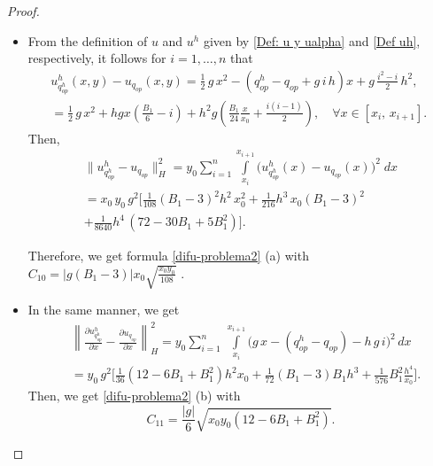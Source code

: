 \documentclass[axioms,article,submit,moreauthors]{Definitions/mdpi}
\newcommand\pder[2][]{\ensuremath{\tfrac{\partial#1}{\partial#2}}}
\begin{document}
\begin{proof}$ $
    \begin{itemize}
      
       \item[(a)] From the definition of $u$ and ${u^h}$ given by \eqref{Def: u y ualpha} and \eqref{Def uh}, respectively, it follows for $i= 1,\ldots, n$ that
  		      \begin{equation}
  		      \begin{array}{ll}
  		       {u^h_{q^h_{op}}}(x,y) - u_{q_{op}}(x,y) =  \tfrac{1}{2} \,g \,x^2-( {q^h_{op}} - q_{op} + g\,i\,h) x + g \,\tfrac{i^2-i}{2}\, h^2 , \quad \\[0.45cm]
  		        =\tfrac{1}{2} \,g \,x^2+h g x\left(\tfrac{B_1}{6}-i \right)+h^2g \left(\tfrac{B_1}{24}\tfrac{x}{x_0}+\tfrac{i(i-1)}{2} \right),\quad \forall x\in [x_i,\,x_{i+1}].
  		        \end{array}
  		        \end{equation}
  		      Then,  
\begin{equation*}
\begin{array}{ll} 
       \lVert {u^h_{q^h_{op}}} - u_{q_{op}}  \rVert _H^2= y_0 \displaystyle\sum\limits_{i=1}^n \displaystyle\int\limits_{x_i}^{x_{i+1}} \Big( {u^h_{q^h_{op}}}(x)-u_{q_{op}}(x)\Big)^2\; dx\\[0.45cm] 
      = x_0\, y_0\, g^2 \Big[\tfrac{1}{108} ( B_1-3)^2 h^2 \,x_0^2+\tfrac{1}{216} h^3\, x_0  (  B_1-3)^2 \\[0.45cm]
      +\frac{1}{8640} h^4\, (72 - 30 B_1 + 5 B_1^2)\Big].
           \end{array}
           \end{equation*}
           
Therefore, we get formula \eqref{difu-problema2} (a) with $C_{10}= \lvert  g (B_1-3)\rvert x_0 \sqrt{\tfrac{x_0 y_0}{108}}$ .
           
           \item [(b)] In the same manner, we get  
            \[\begin{array}{ll}
          &  \left\lVert \pder[{u^h_{q^h_{op}}}]{x} - \pder[u_{q_{op}}]{x}   \right\rVert _H^2 = y_0 \displaystyle \sum\limits_{i=1}^{n} \, \int\limits_{x_i} ^{x_{i+1}} \Big ( g\,x  -({q^h_{op}} - q_{op} ) - h\,g\,i\Big )^2\,dx \\
&=y_0\,g^2\Big[\tfrac{1}{36 }(12 - 6 B_1 + B_1^2) h^2   x_0 +\tfrac{1}{72} (B_1-3) B_1  h^3 +\tfrac{1}{576 }B_1^2  \frac{h^4}{x_0} \Big].
\end{array}\]
  	Then, we get \eqref{difu-problema2} (b) with \[C_{11}=\frac{|g|}{6}\sqrt{x_0 y_0 (12-6B_1+B_1^2)} .\]
 		         
    \end{itemize}
    \end{proof}
       
\end{document}
